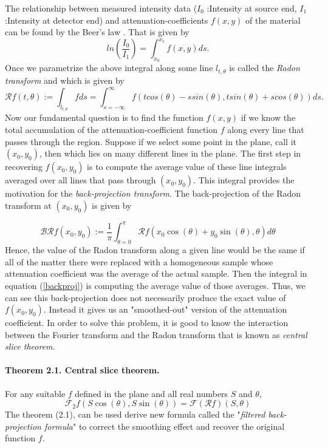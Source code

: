 The relationship between measured intensity data ($I_0 $ :Intensity at source end, $ I_1 $ :Intensity at detector end) and attenuation-coefficients $f(x,y)$ of the material can be found by the Beer's law \cite{TimothyBook}. That is given by
\begin{equation}
ln \left( \frac{I_0}{I_1}\right) = \int_{x_0}^{x_1} f(x,y) ds.
\end{equation}
Once we parametrize the above integral along some line $l_{t,\theta}$ is called the \textit{Radon transform} and which is given by
\begin{equation}
\mathscr{R} f(t,\theta):= \int_{l_{t,\theta}} f ds=\int_{s=-\infty}^{\infty} f(tcos(\theta)-ssin(\theta),tsin(\theta)+scos(\theta))ds.
\end{equation}
Now our fundamental question is to find the function $f(x,y)$ if we know the total accumulation of the attenuation-coefficient function $f$ along every line that passes through the region. Suppose if we select some point in the plane, call it $(x_0,y_0)$, then which lies on many different lines in the plane. The first step in recovering $f(x_0, y_0)$ is to compute the average value of these line integrals averaged over all lines that pass through $(x_0, y_0)$.  This integral provides the motivation for the \textit{back-projection transform}. The back-projection of the Radon transform at $(x_0, y_0)$ is given by 

\begin{equation}\label{backproj}
\mathscr{B}\mathscr{R}f(x_0,y_0):=\dfrac{1}{\pi} \int_{\theta=0}^{\pi}\mathscr{R}f(x_0\cos(\theta)+y_0\sin(\theta),\theta) d\theta
\end{equation}
Hence, the value of the Radon transform along a given line would be the same if all of the matter there were replaced with a homogeneous sample whose attenuation coefficient was the average of the actual sample. Then the integral in equation (\ref{backproj}) is computing the average value of those averages. Thus, we can see this back-projection does not necessarily produce the exact value of $f(x_0,y_0)$. Instead it gives us an "smoothed-out" version of the attenuation coefficient.
In order to solve this problem, it is good to know the interaction between the Fourier transform and the Radon transform that is known as \textit{central slice theorem}.
\paragraph{Theorem 2.1. Central slice theorem.} For any suitable $f$ defined in the plane and all real numbers $S$ and $\theta$,
\begin{equation}\label{slice}
\mathscr{F}_2 f(S \cos(\theta), S \sin(\theta)) = \mathscr{F} (\mathscr{R} f) (S,\theta)
\end{equation}
The theorem (2.1), can be used derive new formula called the "\textit{filtered back-projection formula}" to correct the smoothing effect and recover the original function $f$.

